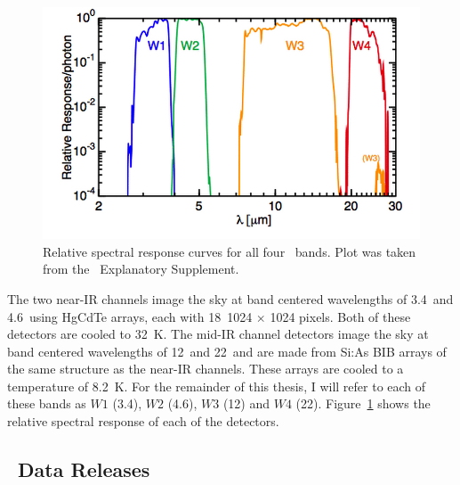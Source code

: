     \begin{figure}
    \centering
    \includegraphics[scale=0.5]{Ch2/wise_response}
    \caption[\WS\ Bands]{Relative spectral response curves for all four \WS\ bands. Plot was taken from the \WS\ Explanatory Supplement.}
    \label{fig:wise_bands}
    \end{figure}
   
   
   The two near-IR channels image the sky at band centered wavelengths of 3.4\micron\ and 4.6\micron\ using HgCdTe arrays, each with 18\micron\ 1024 $\times$ 1024 pixels. Both of these detectors are cooled to 32~K. The mid-IR channel detectors image the sky at band centered wavelengths of 12\micron\ and 22\micron\ and are made from Si:As BIB arrays of the same structure as the near-IR channels. These arrays are cooled to a temperature of 8.2~K. For the remainder of this thesis, I will refer to each of these bands as $W1$ (3.4\micron), $W2$ (4.6\micron), $W3$ (12\micron) and $W4$ (22\micron). Figure~\ref{fig:wise_bands} shows the relative spectral response of each of the detectors. 
   
    
    
   
    \subsection{\WS\ Data Releases}

